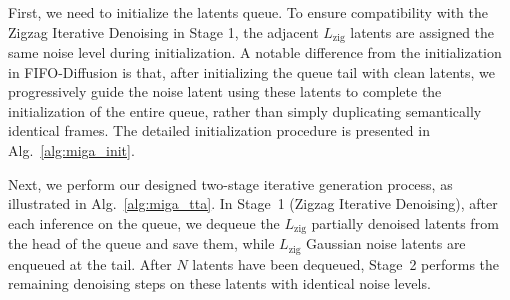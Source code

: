 \documentclass{llmxive}
\begin{document}
First, we need to initialize the latents queue. To ensure compatibility with the Zigzag Iterative Denoising in Stage 1, the adjacent $L_{\mathrm{zig}}$ latents are assigned the same noise level during initialization.  
A notable difference from the initialization in FIFO-Diffusion is that, after initializing the queue tail with clean latents, we progressively guide the noise latent using these latents to complete the initialization of the entire queue, rather than simply duplicating semantically identical frames.
The detailed initialization procedure is presented in Alg.~\ref{alg:miga_init}.


Next, we perform our designed two-stage iterative generation process, as illustrated in Alg.~\ref{alg:miga_tta}. In Stage~1 (Zigzag Iterative Denoising), after each inference on the queue, we dequeue the $L_{\mathrm{zig}}$ partially denoised latents from the head of the queue and save them, while $L_{\mathrm{zig}}$ Gaussian noise latents are enqueued at the tail.  
After $N$ latents have been dequeued, Stage~2 performs the remaining denoising steps on these latents with identical noise levels.
\end{document}
